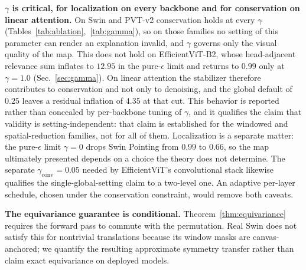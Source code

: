 \documentclass[lettersize,journal]{IEEEtran}
\theoremstyle{definition}
\theoremstyle{plain}
\begin{document}
\textbf{$\gamma$ is critical, for localization on every backbone and for conservation on linear attention.} On Swin and PVT-v2 conservation holds at every $\gamma$ (Tables~\ref{tab:ablation},~\ref{tab:gamma}), so on those families no setting of this parameter can render an explanation invalid, and $\gamma$ governs only the visual quality of the map. This does not hold on EfficientViT-B2, whose head-adjacent relevance sum inflates to $12.95$ in the pure-$\epsilon$ limit and returns to $0.99$ only at $\gamma{=}1.0$ (Sec.~\ref{sec:gamma}). On linear attention the stabilizer therefore contributes to conservation and not only to denoising, and the global default of $0.25$ leaves a residual inflation of $4.35$ at that cut. This behavior is reported rather than concealed by per-backbone tuning of $\gamma$, and it qualifies the claim that validity is setting-independent: that claim is established for the windowed and spatial-reduction families, not for all of them. Localization is a separate matter: the pure-$\epsilon$ limit $\gamma{=}0$ drops Swin Pointing from $0.99$ to $0.66$, so the map ultimately presented depends on a choice the theory does not determine. The separate $\gamma_{\text{conv}}{=}0.05$ needed by EfficientViT's convolutional stack likewise qualifies the single-global-setting claim to a two-level one. An adaptive per-layer schedule, chosen under the conservation constraint, would remove both caveats.

\textbf{The equivariance guarantee is conditional.} Theorem~\ref{thm:equivariance} requires the forward pass to commute with the permutation. Real Swin does not satisfy this for nontrivial translations because its window masks are canvas-anchored; we quantify the resulting approximate symmetry transfer rather than claim exact equivariance on deployed models.
\end{document}
